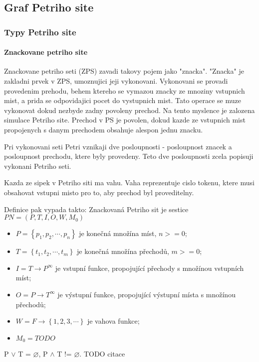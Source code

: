 \subsection{Graf Petriho site}

\subsubsection{Typy Petriho site}

\paragraph{Znackovane petriho site}
Znackovane petriho seti (ZPS) zavadi takovy pojem jako "znacka". "Znacka" je zakladni prvek v ZPS, umoznujici jeji vykonovani. Vykonovani se provadi provedenim prehodu, behem ktereho se vymazou znacky ze mnoziny vstupnich mist, a prida se odpovidajici pocet do vystupnich mist. Tato operace se muze vykonovat dokud nezbyde zadny povoleny prechod. Na tento myslence je zalozena simulace Petriho site. Prechod v PS je povolen, dokud kazde ze vstupnich mist propojenych s danym prechodem obsahuje alespon jednu znacku. 

Pri vykonovani seti Petri vznikaji dve posloupnosti - posloupnost znacek a posloupnost prechodu, ktere byly provedeny. Teto dve posloupnosti zcela popisuji vykonani Petriho seti.

Kazda ze sipek v Petriho siti ma vahu. Vaha reprezentuje cislo tokenu, ktere musi obsahovat vstupni misto pro to, aby prechod byl proveditelny.

Definice pak vypada takto:
Znackovaná Petriho sit je sestice $PN = \left(P, T, I, O, W, M_0\right)$
\begin{itemize}
  \item $P = \left\{p_1, p_2, \cdots , p_n\right\}$ je konečná množína míst, $n >= 0$; \\
  \item $T = \left\{t_1, t_2, \cdots , t_m\right\}$ je konečná množína přechodů, $m >= 0$; \\
  \item $I = T \rightarrow P^\infty$ je vstupní funkce, propojující přechody s množínou vstupních míst; \\
  \item $O = P \rightarrow T^\infty$ je výstupní funkce, propojující výstupní místa s množínou přechodů; \\
  \item $W = F \rightarrow \left\{1, 2, 3, \cdots \right\}$ je vahova funkce;
  \item $M_0 = TODO$
\end{itemize}
P $\vee$ T = $\varnothing$, P $\wedge$ T != $\varnothing$. TODO citace

